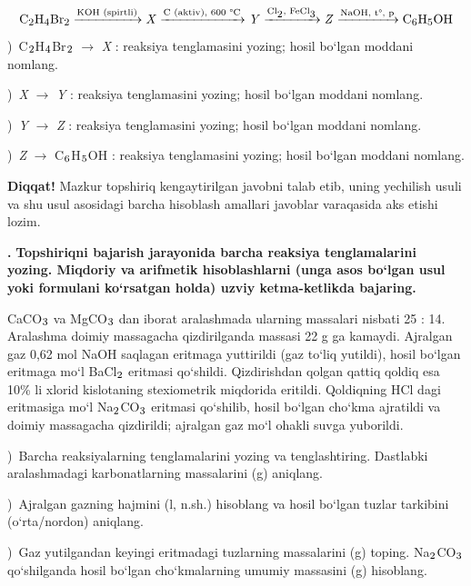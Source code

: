 \documentclass[11pt,a4paper]{article}
\renewcommand{\textsubscript}[1]{\ensuremath{_{\text{\fontsize{8}{8}\selectfont #1}}}}
\newcommand{\qn}[1]{\textbf{\fontsize{11.5}{13}\selectfont #1}}
\newcommand{\qsep}{\par\vspace{13pt}}
\newcommand{\diqqat}[1]{\par\smallskip\noindent\textbf{Diqqat!} #1\par\medskip}
\begin{document}
\[\setlength{\fboxsep}{0pt}\text{C\textsubscript{2}H\textsubscript{4}Br\textsubscript{2}}\xrightarrow{\text{KOH (spirtli)}}\text{\textit{X}}\xrightarrow{\text{C (aktiv), 600 \textdegree{}C}}\text{\textit{Y}}\xrightarrow{\text{Cl\textsubscript{2}, FeCl\textsubscript{3}}}\text{\textit{Z}}\xrightarrow{\text{NaOH, t\textdegree{}, p}}\text{C\textsubscript{6}H\textsubscript{5}OH}\]
)\ C\textsubscript{2}H\textsubscript{4}Br\textsubscript{2} $\to$ \textit{X} : reaksiya tenglamasini yozing; hosil bo`lgan moddani nomlang.\par
{})\ \textit{X} $\to$ \textit{Y} : reaksiya tenglamasini yozing; hosil bo`lgan moddani nomlang.\par
{})\ \textit{Y} $\to$ \textit{Z} : reaksiya tenglamasini yozing; hosil bo`lgan moddani nomlang.\par
{})\ \textit{Z} $\to$ C\textsubscript{6}H\textsubscript{5}OH : reaksiya tenglamasini yozing; hosil bo`lgan moddani nomlang.\par
\diqqat{Mazkur topshiriq kengaytirilgan javobni talab etib, uning yechilish usuli va shu usul asosidagi barcha hisoblash amallari javoblar varaqasida aks etishi lozim.}\qsep
\noindent\qn{43.} \textbf{Topshiriqni bajarish jarayonida barcha reaksiya tenglamalarini yozing. Miqdoriy va arifmetik hisoblashlarni (unga asos bo`lgan usul yoki formulani ko`rsatgan holda) uzviy ketma-ketlikda bajaring.}\par\smallskip
CaCO\textsubscript{3} va MgCO\textsubscript{3} dan iborat aralashmada ularning massalari nisbati 25 : 14. Aralashma doimiy massagacha qizdirilganda massasi 22 g ga kamaydi. Ajralgan gaz 0,62 mol NaOH saqlagan eritmaga yuttirildi (gaz to`liq yutildi), hosil bo`lgan eritmaga mo`l BaCl\textsubscript{2} eritmasi qo`shildi. Qizdirishdan qolgan qattiq qoldiq esa 10\% li xlorid kislotaning stexiometrik miqdorida eritildi. Qoldiqning HCl dagi eritmasiga mo`l Na\textsubscript{2}CO\textsubscript{3} eritmasi qo`shilib, hosil bo`lgan cho`kma ajratildi va doimiy massagacha qizdirildi; ajralgan gaz mo`l ohakli suvga yuborildi.\par
{})\ Barcha reaksiyalarning tenglamalarini yozing va tenglashtiring. Dastlabki aralashmadagi karbonatlarning massalarini (g) aniqlang.\par
{})\ Ajralgan gazning hajmini (l, n.sh.) hisoblang va hosil bo`lgan tuzlar tarkibini (o`rta/nordon) aniqlang.\par
{})\ Gaz yutilgandan keyingi eritmadagi tuzlarning massalarini (g) toping. Na\textsubscript{2}CO\textsubscript{3} qo`shilganda hosil bo`lgan cho`kmalarning umumiy massasini (g) hisoblang.\par
\end{document}
